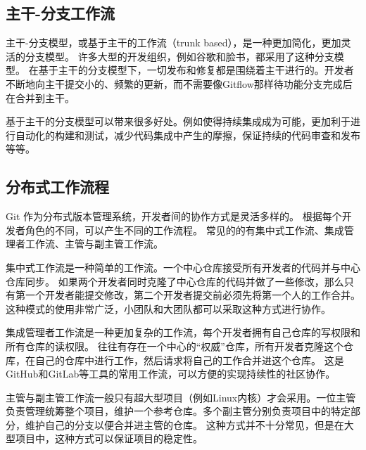 \documentclass[../main.tex]{subfiles}
\begin{document}
\subsection{主干-分支工作流}

主干-分支模型，或基于主干的工作流（trunk based），是一种更加简化，更加灵活的分支模型。
许多大型的开发组织，例如谷歌和脸书，都采用了这种分支模型。\cite{trunkbased}
在基于主干的分支模型下，一切发布和修复都是围绕着主干进行的。开发者不断地向主干提交小的、频繁的更新，而不需要像Gitflow那样待功能分支完成后在合并到主干。

基于主干的分支模型可以带来很多好处。例如使得持续集成成为可能，更加利于进行自动化的构建和测试，减少代码集成中产生的摩擦，保证持续的代码审查和发布等等。
\subsection{分布式工作流程}

Git 作为分布式版本管理系统，开发者间的协作方式是灵活多样的。
根据每个开发者角色的不同，可以产生不同的工作流程。
常见的的有集中式工作流、集成管理者工作流、主管与副主管工作流。

集中式工作流是一种简单的工作流。一个中心仓库接受所有开发者的代码并与中心仓库同步。
如果两个开发者同时克隆了中心仓库的代码并做了一些修改，那么只有第一个开发者能提交修改，第二个开发者提交前必须先将第一个人的工作合并。
这种模式的使用非常广泛，小团队和大团队都可以采取这种方式进行协作。

集成管理者工作流是一种更加复杂的工作流，每个开发者拥有自己仓库的写权限和所有仓库的读权限。
往往有存在一个中心的“权威”仓库，所有开发者克隆这个仓库，在自己的仓库中进行工作，然后请求将自己的工作合并进这个仓库。
这是GitHub和GitLab等工具的常用工作流，可以方便的实现持续性的社区协作。

主管与副主管工作流一般只有超大型项目（例如Linux内核）才会采用。一位主管负责管理统筹整个项目，维护一个参考仓库。多个副主管分别负责项目中的特定部分，维护自己的分支以便合并进主管的仓库。
这种方式并不十分常见，但是在大型项目中，这种方式可以保证项目的稳定性。
\end{document}
